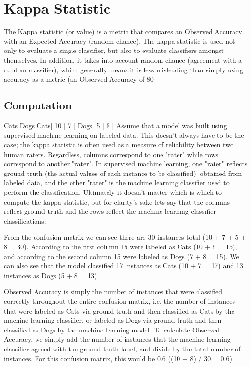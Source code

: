
\section{Kappa Statistic}

The Kappa statistic (or value) is a metric that compares an Observed Accuracy with an Expected Accuracy (random chance). The kappa statistic is used not only to evaluate a single classifier, but also to evaluate classifiers amongst themselves. In addition, it takes into account random chance (agreement with a random classifier), which generally means it is less misleading than simply using accuracy as a metric (an Observed Accuracy of 80%

\subsection{Computation}

     Cats Dogs
Cats| 10 | 7  |
Dogs| 5  | 8  |
Assume that a model was built using supervised machine learning on labeled data. This doesn't always have to be the case; the kappa statistic is often used as a measure of reliability between two human raters. Regardless, columns correspond to one "rater" while rows correspond to another "rater". In supervised machine learning, one "rater" reflects ground truth (the actual values of each instance to be classified), obtained from labeled data, and the other "rater" is the machine learning classifier used to perform the classification. Ultimately it doesn't matter which is which to compute the kappa statistic, but for clarity's sake lets say that the columns reflect ground truth and the rows reflect the machine learning classifier classifications.

From the confusion matrix we can see there are 30 instances total (10 + 7 + 5 + 8 = 30). According to the first column 15 were labeled as Cats (10 + 5 = 15), and according to the second column 15 were labeled as Dogs (7 + 8 = 15). We can also see that the model classified 17 instances as Cats (10 + 7 = 17) and 13 instances as Dogs (5 + 8 = 13).

Observed Accuracy is simply the number of instances that were classified correctly throughout the entire confusion matrix, i.e. the number of instances that were labeled as Cats via ground truth and then classified as Cats by the machine learning classifier, or labeled as Dogs via ground truth and then classified as Dogs by the machine learning model. To calculate Observed Accuracy, we simply add the number of instances that the machine learning classifier agreed with the ground truth label, and divide by the total number of instances. For this confusion matrix, this would be 0.6 ((10 + 8) / 30 = 0.6).

